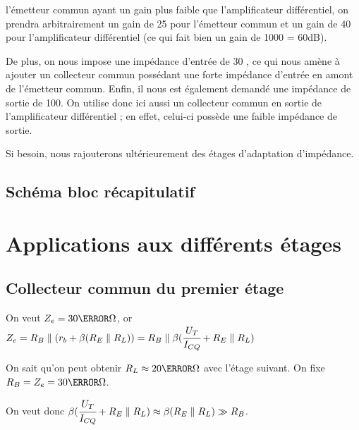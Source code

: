 \documentclass[11pt;a4paper]{report}
\begin{document}
    l'émetteur commun ayant un gain plus faible que l'amplificateur différentiel, on prendra arbitrairement un gain de 25 pour l'émetteur commun et un gain de 40 pour l'amplificateur différentiel (ce qui fait bien un gain de 1000 = 60dB).

    De plus, on nous impose une impédance d'entrée de 30 \kilo\ohm, ce qui nous amène à ajouter un collecteur commun possédant une forte impédance d'entrée en amont de l'émetteur commun.
    Enfin, il nous est également demandé une impédance de sortie de 100\ohm. On utilise donc ici aussi un collecteur commun en sortie de l'amplificateur différentiel ; en effet, celui-ci possède une faible impédance de sortie.

    Si besoin, nous rajouterons ultérieurement des étages d'adaptation d'impédance.


  \section{Schéma bloc récapitulatif}




 \chapter{Applications aux différents étages}
  \section{Collecteur commun du premier étage}
    On veut $Z_e = 30\kilo\ohm$, or $Z_e = R_B \parallel (r_b + \beta ( R_E \parallel R_L ) ) = R_B \parallel \beta ( \cfrac{U_T}{I_{CQ}}+R_E \parallel R_L)$
    
    On sait qu'on peut obtenir $R_L \approx 20 \kilo\ohm$ avec l'étage suivant. On fixe $R_B = Z_e = 30\kilo\ohm$.
    
    On veut donc $\beta(\cfrac{U_T}{I_{CQ}} + R_E \parallel R_L) \approx \beta ( R_E \parallel R_L ) \gg R_B$.
    
\end{document}
